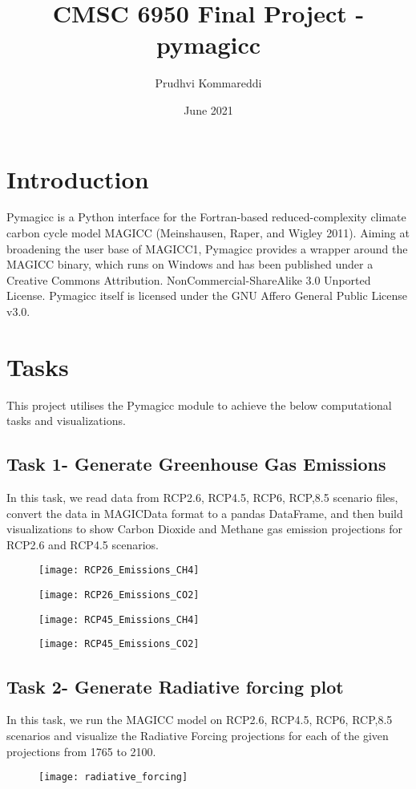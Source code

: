 \documentclass{article}
\title{CMSC 6950 Final Project - pymagicc}
\author{Prudhvi Kommareddi}
\date{June 2021}
\begin{document}
\maketitle

\section{Introduction}
Pymagicc\cite{Gieseke2018} is a Python interface for the Fortran-based reduced-complexity climate carbon cycle model MAGICC (Meinshausen, Raper, and Wigley 2011). Aiming at broadening the user base of MAGICC1, Pymagicc provides a wrapper around the MAGICC binary, which runs on Windows and has been published under a Creative Commons Attribution. NonCommercial-ShareAlike 3.0 Unported License. Pymagicc itself is licensed under the GNU Affero General Public License v3.0.

\section{Tasks}
This project utilises the Pymagicc module to achieve the below computational tasks and visualizations.

\subsection{Task 1- Generate Greenhouse Gas Emissions}
In this task, we read data from RCP2.6, RCP4.5, RCP6, RCP,8.5 scenario files, convert the data in MAGICData format to a pandas DataFrame, and then build visualizations to show Carbon Dioxide and Methane gas emission projections for RCP2.6 and RCP4.5 scenarios. 
\begin{figure}[h]
    \texttt{[image: RCP26\_Emissions\_CH4]}
\end{figure}

\begin{figure}
    \texttt{[image: RCP26\_Emissions\_CO2]}
\end{figure}

\begin{figure}
    \texttt{[image: RCP45\_Emissions\_CH4]}
\end{figure}

\begin{figure}
    \texttt{[image: RCP45\_Emissions\_CO2]}
\end{figure}

\clearpage
\subsection{Task 2- Generate Radiative forcing plot}
In this task, we run the MAGICC model on RCP2.6, RCP4.5, RCP6, RCP,8.5 scenarios and visualize the Radiative Forcing projections for each of the given projections from 1765 to 2100.
\begin{figure}[h]
\texttt{[image: radiative\_forcing]}
\end{figure}



\end{document}
